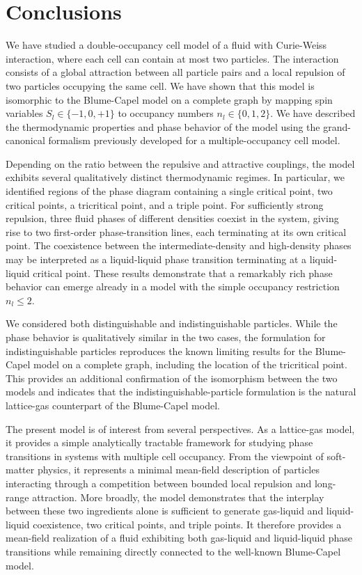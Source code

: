 \documentclass[pdflatex,sn-mathphys-num]{sn-jnl}%
\theoremstyle{thmstyleone}%
\theoremstyle{thmstyletwo}%
\theoremstyle{thmstylethree}%
\begin{document}
	\section{Conclusions}
	
	We have studied a double-occupancy cell model of a fluid with Curie-Weiss interaction, where each cell can contain at most two particles. The interaction consists of a global attraction between all particle pairs and a local repulsion of two particles occupying the same cell. We have shown that this model is isomorphic to the Blume-Capel model on a complete graph by mapping spin variables $S_l \in \{-1, 0, +1\}$ to occupancy numbers $n_l \in \{0, 1, 2\}$.
	We have described the thermodynamic properties and phase behavior of the model using the grand-canonical formalism previously developed for a multiple-occupancy cell model.
	
	Depending on the ratio between the repulsive and attractive couplings, the model exhibits several qualitatively distinct thermodynamic regimes. In particular, we identified regions of the phase diagram containing a single critical point, two critical points, a tricritical point, and a triple point. For sufficiently strong repulsion, three fluid phases of different densities coexist in the system, giving rise to two first-order phase-transition lines, each terminating at its own critical point. The coexistence between the intermediate-density and high-density phases may be interpreted as a liquid-liquid phase transition terminating at a liquid-liquid critical point. These results demonstrate that a remarkably rich phase behavior can emerge already in a model with the simple occupancy restriction $n_l \le 2$.
	
	We considered both distinguishable and indistinguishable particles. While the phase behavior is qualitatively similar in the two cases, the formulation for indistinguishable particles reproduces the known limiting results for the Blume-Capel model on a complete graph, including the location of the tricritical point. This provides an additional confirmation of the isomorphism between the two models and indicates that the indistinguishable-particle formulation is the natural lattice-gas counterpart of the Blume-Capel model.
	
	The present model is of interest from several perspectives. As a lattice-gas model, it provides a simple analytically tractable framework for studying phase transitions in systems with multiple cell occupancy. From the viewpoint of soft-matter physics, it represents a minimal mean-field description of particles interacting through a competition between bounded local repulsion and long-range attraction. More broadly, the model demonstrates that the interplay between these two ingredients alone is sufficient to generate gas-liquid and liquid-liquid coexistence, two critical points, and triple points. It therefore provides a mean-field realization of a fluid exhibiting both gas-liquid and liquid-liquid phase transitions while remaining directly connected to the well-known Blume-Capel model.
\end{document}
